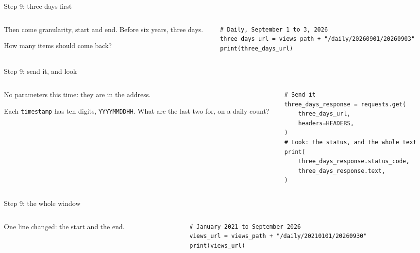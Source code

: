 \documentclass[9pt,aspectratio=169]{beamer}
\begin{document}
\begin{frame}[fragile]{Step 9: three days first}
    \begin{columns}[T]
        \begin{column}{0.37\textwidth}
            Then come granularity, start and end. Before six years, three days.

            \medskip
            How many items should come back?
        \end{column}
        \begin{column}{0.6\textwidth}
\begin{lstlisting}
# Daily, September 1 to 3, 2026
three_days_url = views_path + "/daily/20260901/20260903"
print(three_days_url)
\end{lstlisting}
        \end{column}
    \end{columns}
\end{frame}

\begin{frame}[fragile]{Step 9: send it, and look}
    \begin{columns}[T]
        \begin{column}{0.37\textwidth}
            No parameters this time: they are in the address.

            \medskip
            Each \texttt{timestamp} has ten digits, \texttt{YYYYMMDDHH}. What are the last two for, on a daily count?
        \end{column}
        \begin{column}{0.6\textwidth}
\begin{lstlisting}
# Send it
three_days_response = requests.get(
    three_days_url,
    headers=HEADERS,
)
# Look: the status, and the whole text
print(
    three_days_response.status_code,
    three_days_response.text,
)
\end{lstlisting}
        \end{column}
    \end{columns}
\end{frame}

\begin{frame}[fragile]{Step 9: the whole window}
    \begin{columns}[T]
        \begin{column}{0.37\textwidth}
            One line changed: the start and the end.
        \end{column}
        \begin{column}{0.6\textwidth}
\begin{lstlisting}
# January 2021 to September 2026
views_url = views_path + "/daily/20210101/20260930"
print(views_url)
\end{lstlisting}
        \end{column}
    \end{columns}
\end{frame}
\end{document}
